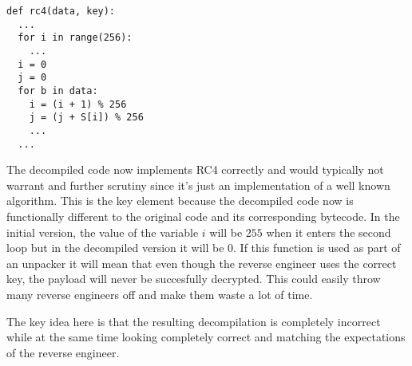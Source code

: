 \documentclass[twocolumn]{article}
\begin{document}
\begin{verbatim}
def rc4(data, key):
  ...
  for i in range(256):
    ...
  i = 0
  j = 0
  for b in data:
    i = (i + 1) % 256
    j = (j + S[i]) % 256
    ...
  ...
\end{verbatim}

The decompiled code now implements RC4 correctly and would typically not warrant and further scrutiny since it's just an implementation of a well known algorithm. This is the key element because the decompiled code now is functionally different to the original code and its corresponding bytecode. In the initial version, the value of the variable $i$ will be $255$ when it enters the second loop but in the decompiled version it will be $0$. If this function is used as part of an unpacker it will mean that even though the reverse engineer uses the correct key, the payload will never be succesfully decrypted. This could easily throw many reverse engineers off and make them waste a lot of time.

The key idea here is that the resulting decompilation is completely incorrect while at the same time looking completely correct and matching the expectations of the reverse engineer.


\end{document}

